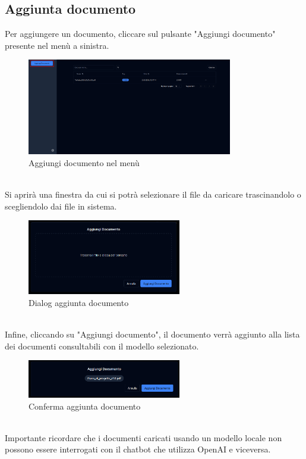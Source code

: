 \subsection{Aggiunta documento}
Per aggiungere un documento, cliccare sul pulsante "Aggiungi documento" presente nel menù a sinistra.
\begin{figure}[h!]
    \centering
    \includegraphics[width=0.8\textwidth]{schermatadocaggiungi.png}
    \caption{Aggiungi documento nel menù}\label{fig:adddocs}
\end{figure}
\\Si aprirà una finestra da cui si potrà selezionare il file da caricare trascinandolo o scegliendolo dai file in sistema.
\begin{figure}[h!]
    \centering
    \includegraphics[width=0.6\textwidth]{dialogadd.png}
    \caption{Dialog aggiunta documento}\label{fig:dialogadd}
\end{figure}
\\Infine, cliccando su "Aggiungi documento", il documento verrà aggiunto alla lista dei documenti consultabili con il modello selezionato.
\begin{figure}[h!]
    \centering
    \includegraphics[width=0.6\textwidth]{docadd.png}
    \caption{Conferma aggiunta documento}\label{fig:confirmadd}
\end{figure}
\\Importante ricordare che i documenti caricati usando un modello locale non possono essere interrogati con il chatbot che utilizza OpenAI e viceversa.
